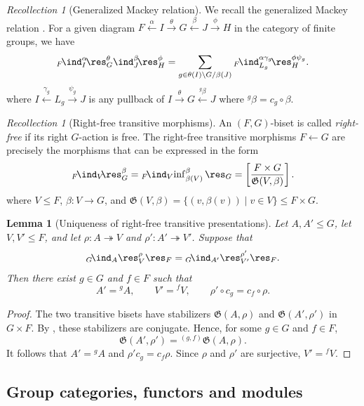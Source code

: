 \documentclass{amsart}
\numberwithin{equation}{section}%
\newtheorem{Lem}[equation]{Lemma}
\theoremstyle{remark}
\newtheorem{Rec}[equation]{Recollection}
\theoremstyle{definition}
\newcommand{\lind}[1]{{}_{#1}\!\ind}
\newcommand{\lres}[1]{{}_{#1}\!\res}
\renewcommand{\inf}{\mathop{\mathrm{inf}}\nolimits}
\begin{document}
%
\begin{Rec}[Generalized Mackey relation]
\label{rec:generalized-mackey-relation}
We recall the generalized Mackey relation
\cite[Prop.~2.3]{Barker16b}. For a given diagram 
$F \stackrel{\alpha}\leftarrow I 
\stackrel{\theta}\rightarrow G \stackrel{\beta}
\leftarrow J \stackrel{\phi}\rightarrow H$
in the category of finite groups, we have
%
\[
\lind{F}_{I}^{\alpha}\!\res_{G}^{\theta}
\ind_{J}^{\beta}\!\res_{H}^{\phi}
=
\sum_{g\in\theta(I)\backslash G/\beta(J)}
\lind{F}_{L_g}^{\alpha\gamma_g}\!
\res_H^{\phi\psi_g}.
\]
%
where $I\stackrel{\gamma_{g}}\leftarrow L_{g} \stackrel{\psi_{g}}\rightarrow J$ 
is any pullback of 
$I \stackrel{\theta}\rightarrow G \stackrel{^{g}\beta}\leftarrow J$ where ${}^g\beta=c_g\circ\beta$.
\end{Rec}
%
\begin{Rec}[Right-free transitive morphisms]
\label{rec:right-free-transitive-morphisms}
An $(F,G)$-biset is called \emph{right-free} if its right
$G$-action is free. The right-free transitive morphisms
$F\leftarrow G$ are precisely the morphisms that can be expressed
in the form
%
\[
\lind{F}_V\!\lres{}_G^\beta
=
\lind{F}_V\!\inf_{\beta(V)}^\beta\res_G
=
\left[
\frac{F\times G}{\mathfrak G(V,\beta)}
\right].
\]
%
where $V\leq F$, $\beta\colon V\to G$, and
$\mathfrak G(V,\beta)
=
\{(v,\beta(v))\mid v\in V\}
\leq F\times G$.
\end{Rec}
%
\begin{Lem}[Uniqueness of right-free transitive presentations]
\label{lem:right-free-transitive-uniqueness}
Let $A,A'\leq G$, let $V,V'\leq F$, and let
$\rho:A\twoheadrightarrow V$ and $\rho':A'\twoheadrightarrow V'$.
Suppose that
\[
\lind{G}_A\res^{\rho}_V\res_F
=
\lind{G}_{A'}\res^{\rho'}_{V'}\res_F .
\]
Then there exist $g\in G$ and $f\in F$ such that
\[
A'={}^{g}A,\qquad
V'={}^{f}V,\qquad
\rho'\circ c_g=c_f\circ\rho .
\]
\end{Lem}
%
\begin{proof}
The two transitive bisets have stabilizers
$\mathfrak G(A,\rho)$ and $\mathfrak G(A',\rho')$ in $G\times F$.
By , these stabilizers are conjugate. Hence, for some
$g\in G$ and $f\in F$,
\[
\mathfrak G(A',\rho')
={}^{(g,f)}\mathfrak G(A,\rho).
\]
It follows that $A'={}^{g}A$ and
$\rho'c_g=c_f\rho$. Since $\rho$ and $\rho'$ are surjective,
$V'={}^{f}V$.
\end{proof}
%


%
\subsection{Group categories, functors and modules}\
\label{ssec:group-categories}
%
\end{document}

